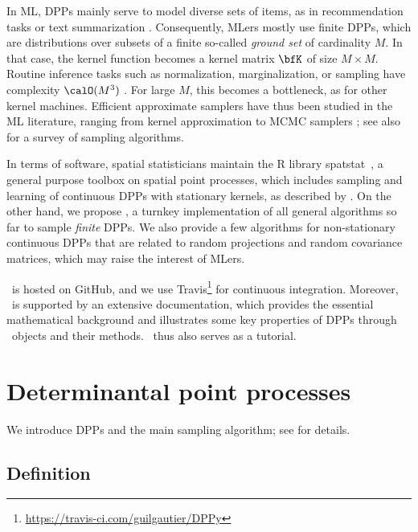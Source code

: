 \documentclass[twoside,11pt]{article}
\begin{document}
  In ML, DPPs mainly serve to model diverse sets of items, as in recommendation tasks \citep{KaDeKo16, GaPaKo16} or text summarization \citep{DuBa18}.
  Consequently, MLers mostly use finite DPPs, which are distributions over subsets of a finite so-called \emph{ground set} of cardinality $M$.
  In that case, the kernel function becomes a kernel matrix $\bfK$ of size $M\times M$.
  Routine inference tasks such as normalization, marginalization, or sampling have complexity $\calO(M^3)$ \citep{KuTa12}.
  For large $M$, this becomes a bottleneck, as for other kernel machines.
  Efficient approximate samplers have thus been studied in the ML literature, ranging from kernel approximation \citep{AKFT13} to MCMC samplers \citep{AnGhRe16, LiJeSr16c, GaBaVa17}; see also \citet{TrBaAm18} for a survey of sampling algorithms.

  In terms of software, spatial statisticians maintain the R library \textsf{spatstat}\ \citep{BaTu05}, a general purpose toolbox on spatial point processes, which includes sampling and learning of continuous DPPs with stationary kernels, as described by \citet{LaMoRu15}.
  On the other hand, we propose \DPPy, a turnkey implementation of all general algorithms so far to sample \emph{finite} DPPs.
  We also provide a few algorithms for non-stationary continuous DPPs that are related to random projections and random covariance matrices, which may raise the interest of MLers.

  \DPPy\ is hosted on GitHub, and we use \setcounter{footnote}{5}Travis\footnote{\url{https://travis-ci.com/guilgautier/DPPy}} for continuous integration.%
  Moreover, \DPPy\ is supported by an extensive documentation, which provides the essential mathematical background and illustrates some key properties of DPPs through \DPPy\ objects and their methods.
  \DPPy\ thus also serves as a tutorial.


\section{Determinantal point processes} %
\label{sec:determinantal_point_processes}

	We introduce DPPs and the main sampling algorithm; see \citet{HKPV06} for details.

  \subsection{Definition} %
  \label{sub:definition}
\end{document}
